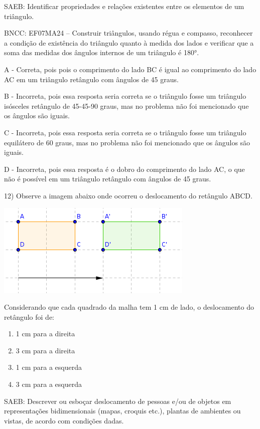 SAEB: Identificar propriedades e relações existentes entre os elementos
de um triângulo.

BNCC: EF07MA24 -- Construir triângulos, usando régua e compasso,
reconhecer a condição de existência do triângulo quanto à medida dos
lados e verificar que a soma das medidas dos ângulos internos de um
triângulo é 180°.

A - Correta, pois pois o comprimento do lado BC é igual ao comprimento
do lado AC em um triângulo retângulo com ângulos de 45 graus.

B - Incorreta, pois essa resposta seria correta se o triângulo fosse um
triângulo isósceles retângulo de 45-45-90 graus, mas no problema não foi
mencionado que os ângulos são iguais.

C - Incorreta, pois essa resposta seria correta se o triângulo fosse um
triângulo equilátero de 60 graus, mas no problema não foi mencionado que
os ângulos são iguais.

D - Incorreta, pois essa resposta é o dobro do comprimento do lado AC, o
que não é possível em um triângulo retângulo com ângulos de 45 graus.

12) Observe a imagem abaixo onde ocorreu o deslocamento do retângulo
ABCD.

\includegraphics{./imgSAEB_7_MAT/media/image98.png}

Considerando que cada quadrado da malha tem 1 cm de lado, o deslocamento
do retângulo foi de:

\begin{enumerate}
\def\labelenumi{\alph{enumi})}
\item
  1 cm para a direita
\item
  3 cm para a direita
\item
  1 cm para a esquerda
\item
  3 cm para a esquerda
\end{enumerate}

SAEB: Descrever ou esboçar deslocamento de pessoas e/ou de objetos em
representações bidimensionais (mapas, croquis etc.), plantas de
ambientes ou vistas, de acordo com condições dadas.

